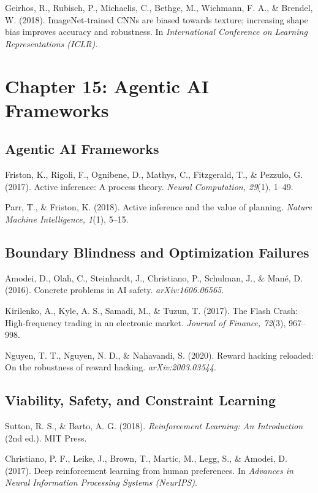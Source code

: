 \documentclass[
  openright]{book}
\begin{document}
Geirhos, R., Rubisch, P., Michaelis, C., Bethge, M., Wichmann, F. A., \&
Brendel, W. (2018). ImageNet-trained CNNs are biased towards texture;
increasing shape bias improves accuracy and robustness. In
\emph{International Conference on Learning Representations (ICLR)}.

\section{Chapter 15: Agentic AI
Frameworks}\label{chapter-15-agentic-ai-frameworks}

\subsection{Agentic AI Frameworks}\label{agentic-ai-frameworks}

Friston, K., Rigoli, F., Ognibene, D., Mathys, C., Fitzgerald, T., \&
Pezzulo, G. (2017). Active inference: A process theory. \emph{Neural
Computation, 29}(1), 1--49.

Parr, T., \& Friston, K. (2018). Active inference and the value of
planning. \emph{Nature Machine Intelligence, 1}(1), 5--15.

\subsection{Boundary Blindness and Optimization
Failures}\label{boundary-blindness-and-optimization-failures}

Amodei, D., Olah, C., Steinhardt, J., Christiano, P., Schulman, J., \&
Mané, D. (2016). Concrete problems in AI safety.
\emph{arXiv:1606.06565}.

Kirilenko, A., Kyle, A. S., Samadi, M., \& Tuzun, T. (2017). The Flash
Crash: High-frequency trading in an electronic market. \emph{Journal of
Finance, 72}(3), 967--998.

Nguyen, T. T., Nguyen, N. D., \& Nahavandi, S. (2020). Reward hacking
reloaded: On the robustness of reward hacking. \emph{arXiv:2003.03544}.

\subsection{Viability, Safety, and Constraint
Learning}\label{viability-safety-and-constraint-learning}

Sutton, R. S., \& Barto, A. G. (2018). \emph{Reinforcement Learning: An
Introduction} (2nd ed.). MIT Press.

Christiano, P. F., Leike, J., Brown, T., Martic, M., Legg, S., \&
Amodei, D. (2017). Deep reinforcement learning from human preferences.
In \emph{Advances in Neural Information Processing Systems (NeurIPS)}.
\end{document}
